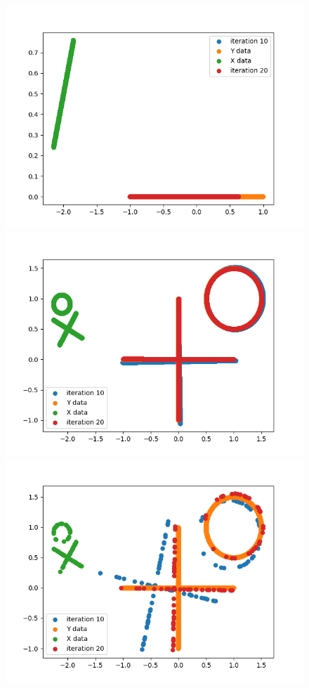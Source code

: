 \documentclass[a4paper,12pt]{article}
\begin{document}
\begin{figure}[H]
\centering
\includegraphics[scale = 0.45]{line_shape.png}
\includegraphics[scale = 0.45]{circle_cross_shape.png}
\includegraphics[scale = 0.45]{circle_cross_shape2.png}

\end{figure}
\end{document}
